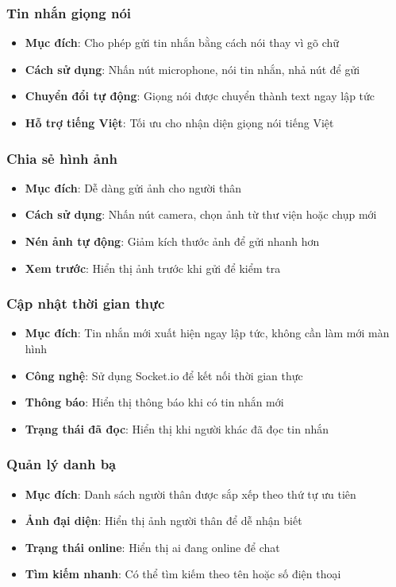\documentclass[12pt,a4paper]{article}
\begin{document}
\subsubsection{Tin nhắn giọng nói}
\begin{itemize}[leftmargin=2cm]
    \item \textbf{Mục đích}: Cho phép gửi tin nhắn bằng cách nói thay vì gõ chữ
    \item \textbf{Cách sử dụng}: Nhấn nút microphone, nói tin nhắn, nhả nút để gửi
    \item \textbf{Chuyển đổi tự động}: Giọng nói được chuyển thành text ngay lập tức
    \item \textbf{Hỗ trợ tiếng Việt}: Tối ưu cho nhận diện giọng nói tiếng Việt
\end{itemize}

\subsubsection{Chia sẻ hình ảnh}
\begin{itemize}[leftmargin=2cm]
    \item \textbf{Mục đích}: Dễ dàng gửi ảnh cho người thân
    \item \textbf{Cách sử dụng}: Nhấn nút camera, chọn ảnh từ thư viện hoặc chụp mới
    \item \textbf{Nén ảnh tự động}: Giảm kích thước ảnh để gửi nhanh hơn
    \item \textbf{Xem trước}: Hiển thị ảnh trước khi gửi để kiểm tra
\end{itemize}

\subsubsection{Cập nhật thời gian thực}
\begin{itemize}[leftmargin=2cm]
    \item \textbf{Mục đích}: Tin nhắn mới xuất hiện ngay lập tức, không cần làm mới màn hình
    \item \textbf{Công nghệ}: Sử dụng Socket.io để kết nối thời gian thực
    \item \textbf{Thông báo}: Hiển thị thông báo khi có tin nhắn mới
    \item \textbf{Trạng thái đã đọc}: Hiển thị khi người khác đã đọc tin nhắn
\end{itemize}

\subsubsection{Quản lý danh bạ}
\begin{itemize}[leftmargin=2cm]
    \item \textbf{Mục đích}: Danh sách người thân được sắp xếp theo thứ tự ưu tiên
    \item \textbf{Ảnh đại diện}: Hiển thị ảnh người thân để dễ nhận biết
    \item \textbf{Trạng thái online}: Hiển thị ai đang online để chat
    \item \textbf{Tìm kiếm nhanh}: Có thể tìm kiếm theo tên hoặc số điện thoại
\end{itemize}
\end{document}
